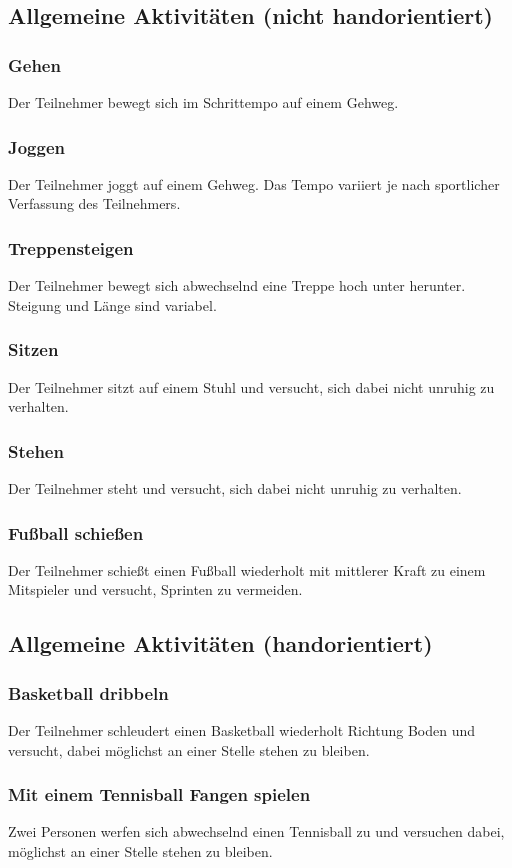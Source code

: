 \subsection{Allgemeine Aktivitäten (nicht handorientiert)}
\subsubsection{Gehen}
Der Teilnehmer bewegt sich im Schrittempo auf einem Gehweg.
\subsubsection{Joggen}
Der Teilnehmer joggt auf einem Gehweg. Das Tempo variiert je nach sportlicher Verfassung des Teilnehmers.
\subsubsection{Treppensteigen}
Der Teilnehmer bewegt sich abwechselnd eine Treppe hoch unter herunter. Steigung und Länge sind variabel.
\subsubsection{Sitzen}
Der Teilnehmer sitzt auf einem Stuhl und versucht, sich dabei nicht unruhig zu verhalten.
\subsubsection{Stehen}
Der Teilnehmer steht und versucht, sich dabei nicht unruhig zu verhalten.
\subsubsection{Fußball schießen}
Der Teilnehmer schießt einen Fußball wiederholt mit mittlerer Kraft zu einem Mitspieler und versucht, Sprinten zu vermeiden.

\subsection{Allgemeine Aktivitäten (handorientiert)}
\subsubsection{Basketball dribbeln}
Der Teilnehmer schleudert einen Basketball wiederholt Richtung Boden und versucht, dabei möglichst an einer Stelle stehen zu bleiben.
\subsubsection{Mit einem Tennisball Fangen spielen}
Zwei Personen werfen sich abwechselnd einen Tennisball zu und versuchen dabei, möglichst an einer Stelle stehen zu bleiben.
